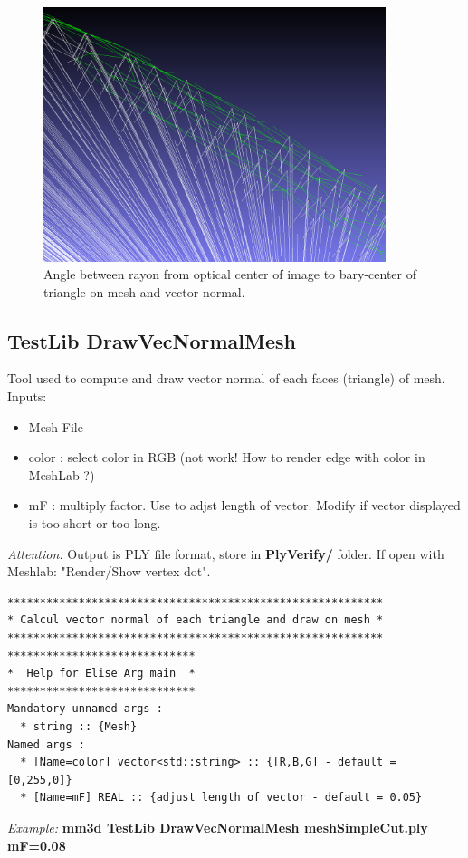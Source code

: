 \begin{figure}[H]
\centering
\includegraphics[width=10cm]{FIGS/MeshProjOnImg/meshViewable2.png}
\caption{Angle between rayon from optical center of image to bary-center of triangle on mesh and vector normal.}
\label{SurfCorr}
\end{figure}

\subsection{TestLib DrawVecNormalMesh}
Tool used to compute and draw vector normal of each faces (triangle) of mesh.
Inputs:
\begin{itemize}
\item Mesh File
\item color : select color in RGB (not work! How to render edge with color in MeshLab ?)
\item mF : multiply factor. Use to adjst length of vector. Modify if vector displayed is too short or too long.
\end{itemize}
\textit{Attention:} Output is PLY file format, store in \textbf{PlyVerify/} folder. If open with Meshlab: "Render/Show vertex dot".

\begin{verbatim}
**********************************************************
* Calcul vector normal of each triangle and draw on mesh *
**********************************************************
*****************************
*  Help for Elise Arg main  *
*****************************
Mandatory unnamed args : 
  * string :: {Mesh}
Named args : 
  * [Name=color] vector<std::string> :: {[R,B,G] - default = [0,255,0]}
  * [Name=mF] REAL :: {adjust length of vector - default = 0.05}
\end{verbatim}
\textit{Example:}
\textbf{mm3d TestLib DrawVecNormalMesh meshSimpleCut.ply mF=0.08}

